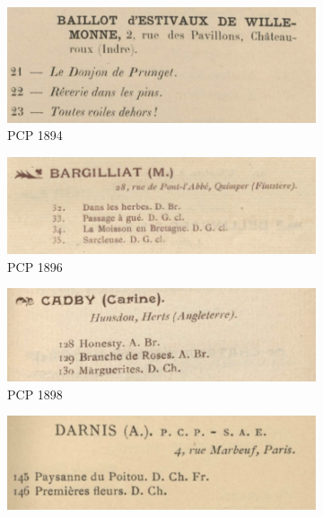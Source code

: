 \documentclass[a4paper,12pt,twoside]{book}
\begin{document}
	\begin{figure}	
		\begin{subfigure}{0.5\textwidth}
			\includegraphics[scale=0.5]{PCP1894.png}
			\centering
			\caption{PCP 1894}
		\end{subfigure}
			\begin{subfigure}{0.5\textwidth}
			\includegraphics[scale=0.5]{PCP1896.png}
			\centering
			\caption{PCP 1896}
		\end{subfigure}
			\begin{subfigure}{0.5\textwidth}
			\includegraphics[scale=0.5]{PCP1898.png}
			\centering
			\caption{PCP 1898}
		\end{subfigure}
			\begin{subfigure}{0.5\textwidth}
			\includegraphics[scale=0.5]{PCP1902.png}

\end{subfigure}
\end{figure}
\end{document}
